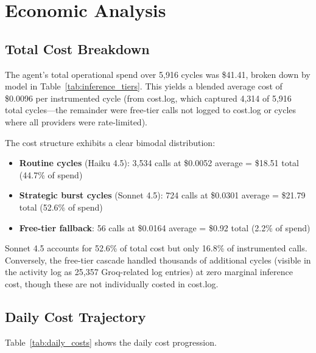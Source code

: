 \documentclass[11pt,a4paper]{article}
\begin{document}
\section{Economic Analysis}
\label{sec:economics}

\subsection{Total Cost Breakdown}

The agent's total operational spend over 5,916 cycles was \$41.41, broken down by model in Table~\ref{tab:inference_tiers}. This yields a blended average cost of \$0.0096 per instrumented cycle (from cost.log, which captured 4,314 of 5,916 total cycles---the remainder were free-tier calls not logged to cost.log or cycles where all providers were rate-limited).

The cost structure exhibits a clear bimodal distribution:

\begin{itemize}
    \item \textbf{Routine cycles} (Haiku 4.5): 3,534 calls at \$0.0052 average = \$18.51 total (44.7\% of spend)
    \item \textbf{Strategic burst cycles} (Sonnet 4.5): 724 calls at \$0.0301 average = \$21.79 total (52.6\% of spend)
    \item \textbf{Free-tier fallback}: 56 calls at \$0.0164 average = \$0.92 total (2.2\% of spend)
\end{itemize}

Sonnet 4.5 accounts for 52.6\% of total cost but only 16.8\% of instrumented calls. Conversely, the free-tier cascade handled thousands of additional cycles (visible in the activity log as 25,357 Groq-related log entries) at zero marginal inference cost, though these are not individually costed in cost.log.

\subsection{Daily Cost Trajectory}

Table~\ref{tab:daily_costs} shows the daily cost progression.
\end{document}
